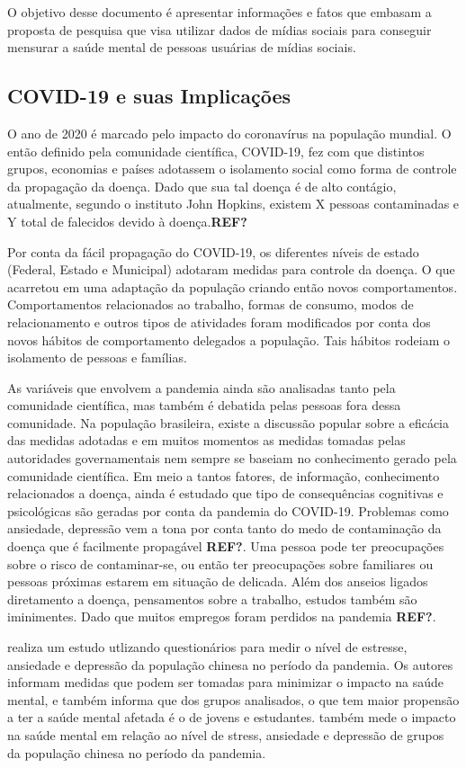 \documentclass[11pt, notitlepage]{article} %
\begin{document}
O objetivo desse documento é apresentar informações e fatos que embasam a proposta de pesquisa que visa utilizar dados de mídias sociais para conseguir mensurar a saúde mental de pessoas usuárias de mídias sociais.

\subsection*{COVID-19 e suas Implicações}
O ano de 2020 é marcado pelo impacto do coronavírus na população mundial. O então definido pela comunidade científica, COVID-19, fez com que distintos grupos, economias e países adotassem o isolamento social como forma de controle da propagação da doença. Dado que sua tal doença é de alto contágio, atualmente, segundo o instituto John Hopkins, existem X pessoas contaminadas e Y total de falecidos devido à doença.\textbf{REF?}

Por conta da fácil propagação do COVID-19, os diferentes níveis de estado (Federal, Estado e Municipal) adotaram medidas para controle da doença. O que acarretou em uma adaptação da população criando então novos comportamentos. 
Comportamentos relacionados ao trabalho, formas de consumo, modos de relacionamento e outros tipos de atividades foram modificados por conta dos novos hábitos de comportamento delegados a população. Tais hábitos rodeiam o isolamento de pessoas e famílias. 

As variáveis que envolvem a pandemia ainda são analisadas tanto pela comunidade científica, mas também é debatida pelas pessoas fora dessa comunidade. Na população brasileira, existe a discussão popular sobre a eficácia das medidas adotadas e em muitos momentos as medidas tomadas pelas autoridades governamentais nem sempre se baseiam no conhecimento gerado pela comunidade científica.
Em meio a tantos fatores, de informação, conhecimento relacionados a doença, ainda é estudado que tipo de consequências cognitivas e psicológicas são geradas por conta da pandemia do COVID-19. Problemas como ansiedade, depressão vem a tona por conta tanto do medo de contaminação da doença que é facilmente propagável \textbf{REF?}. Uma pessoa pode ter preocupações sobre o risco de contaminar-se, ou então ter preocupações sobre familiares ou pessoas próximas estarem em situação de delicada. Além dos anseios ligados diretamento a doença, pensamentos sobre a trabalho, estudos também são iminimentes. Dado que muitos empregos foram perdidos na pandemia \textbf{REF?}.

\cite{PMID:32298802} realiza um  estudo utlizando questionários para medir o nível de estresse, ansiedade e depressão da população chinesa no período da pandemia. Os autores informam medidas que podem ser tomadas para minimizar o impacto na saúde mental, e também informa que dos grupos analisados, o que tem maior propensão a ter a saúde mental afetada é o de jovens e estudantes. \cite{wang2020immediate} também mede o impacto na saúde mental em relação ao nível de stress, ansiedade e depressão de grupos da população chinesa no período da pandemia. 
\end{document}
